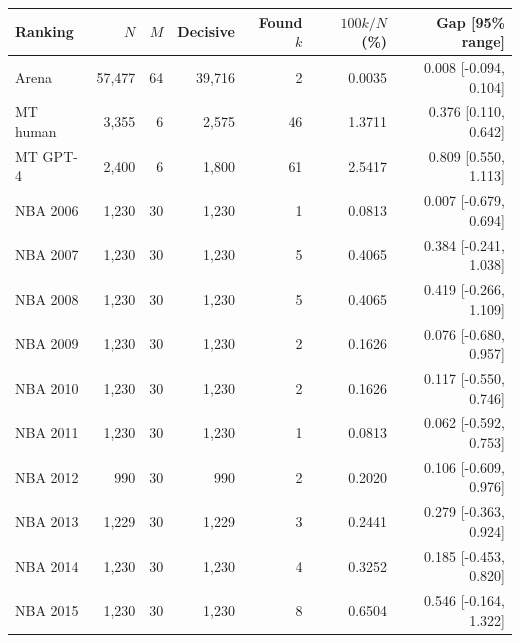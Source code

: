 \begin{tabular}{lrrrrrr}
\toprule
Ranking & $N$ & $M$ & Decisive & Found $k$ & $100k/N$ (\%) & Gap [95\% range] \\
\midrule
Arena & 57,477 & 64 & 39,716 & 2 & 0.0035 & 0.008 [-0.094, 0.104] \\
MT human & 3,355 & 6 & 2,575 & 46 & 1.3711 & 0.376 [0.110, 0.642] \\
MT GPT-4 & 2,400 & 6 & 1,800 & 61 & 2.5417 & 0.809 [0.550, 1.113] \\
NBA 2006 & 1,230 & 30 & 1,230 & 1 & 0.0813 & 0.007 [-0.679, 0.694] \\
NBA 2007 & 1,230 & 30 & 1,230 & 5 & 0.4065 & 0.384 [-0.241, 1.038] \\
NBA 2008 & 1,230 & 30 & 1,230 & 5 & 0.4065 & 0.419 [-0.266, 1.109] \\
NBA 2009 & 1,230 & 30 & 1,230 & 2 & 0.1626 & 0.076 [-0.680, 0.957] \\
NBA 2010 & 1,230 & 30 & 1,230 & 2 & 0.1626 & 0.117 [-0.550, 0.746] \\
NBA 2011 & 1,230 & 30 & 1,230 & 1 & 0.0813 & 0.062 [-0.592, 0.753] \\
NBA 2012 & 990 & 30 & 990 & 2 & 0.2020 & 0.106 [-0.609, 0.976] \\
NBA 2013 & 1,229 & 30 & 1,229 & 3 & 0.2441 & 0.279 [-0.363, 0.924] \\
NBA 2014 & 1,230 & 30 & 1,230 & 4 & 0.3252 & 0.185 [-0.453, 0.820] \\
NBA 2015 & 1,230 & 30 & 1,230 & 8 & 0.6504 & 0.546 [-0.164, 1.322] \\
\bottomrule
\end{tabular}
